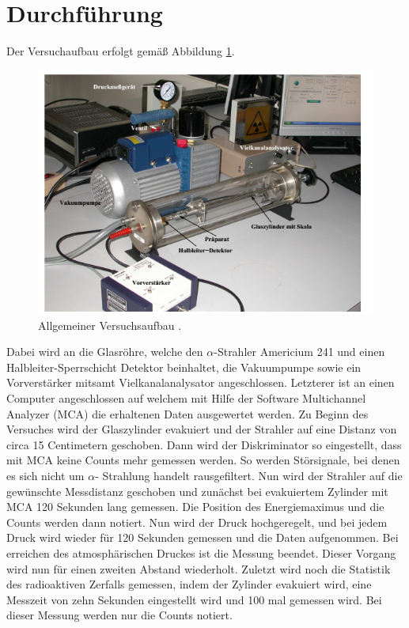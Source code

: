 \section{Durchführung}
\label{sec:Durchführung}
Der Versuchaufbau erfolgt gemäß Abbildung \ref{fig:aufbau}.
\begin{figure}
  \centering
  \includegraphics{images/aufbau.png}
  \caption{Allgemeiner Versuchsaufbau \cite{1}.}
  \label{fig:aufbau}
\end{figure}
Dabei wird an die Glasröhre, welche den $\alpha$-Strahler Americium 241 und einen Halbleiter-Sperrschicht Detektor beinhaltet, die Vakuumpumpe sowie ein Vorverstärker mitsamt Vielkanalanalysator angeschlossen.
Letzterer ist an einen Computer angeschlossen auf welchem mit Hilfe der Software Multichannel Analyzer (MCA) die erhaltenen Daten ausgewertet werden.
Zu Beginn des Versuches wird der Glaszylinder evakuiert und der Strahler auf eine Distanz von circa 15 Centimetern geschoben.
Dann wird der Diskriminator so eingestellt, dass mit MCA keine Counts mehr gemessen werden. So werden Störsignale, bei denen es sich nicht um $\alpha$- Strahlung handelt
rausgefiltert. Nun wird der Strahler auf die gewünschte Messdistanz geschoben und zunächst bei evakuiertem Zylinder mit MCA 120 Sekunden lang gemessen. Die Position des
Energiemaximus und die Counts werden dann notiert. Nun wird der Druck hochgeregelt, und bei jedem Druck wird wieder für 120 Sekunden gemessen und die Daten aufgenommen.
Bei erreichen des atmosphärischen Druckes ist die Messung beendet. Dieser Vorgang wird nun für einen zweiten Abstand wiederholt.
Zuletzt wird noch die Statistik des radioaktiven Zerfalls gemessen, indem der Zylinder evakuiert wird, eine Messzeit von zehn Sekunden eingestellt wird und 100 mal gemessen wird.
Bei dieser Messung werden nur die Counts notiert.
